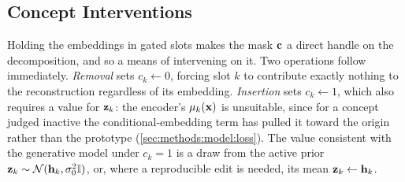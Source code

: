 
\subsection{Concept Interventions} \label{sec:methods:model:interventions}

Holding the embeddings in gated slots makes the mask
$\vb{c}$ a direct handle on the decomposition, and so a means of intervening on
it. Two operations follow immediately. \textit{Removal} sets $c_k \leftarrow 0$,
forcing slot $k$ to contribute exactly nothing to the reconstruction regardless
of its embedding. \textit{Insertion} sets $c_k \leftarrow 1$, which also
requires a value for $\vb{z}_k$: the encoder's $\vb{\mu}_k(\vb{x})$ is
unsuitable, since for a concept judged inactive the conditional-embedding term
has pulled it toward the origin rather than the prototype
(\cref{sec:methods:model:loss}). The
value consistent with the generative model under $c_k = 1$ is a draw from the
active prior $\vb{z}_k \sim \mathcal{N}(\vb{h}_k, \sigma_0^2 \mathbb{I})$, or,
where a reproducible edit is needed, its mean $\vb{z}_k \leftarrow \vb{h}_k$.

